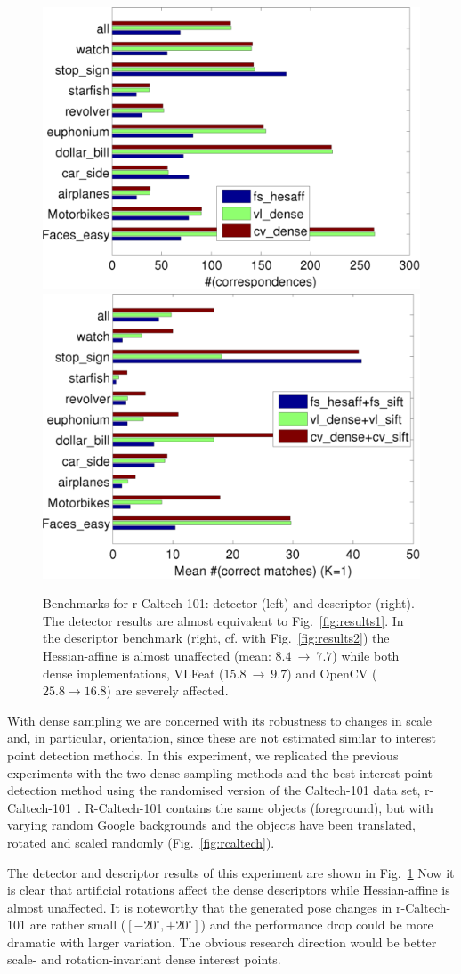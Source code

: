 \documentclass[journal]{IEEEtran}
\begin{document}
\begin{figure}
  \begin{center}
    \includegraphics[width=0.48\linewidth]{resources/joni_results/PLOT_detectors_benchmark1report2-rcaltech101-detcor-avg.png}
    \includegraphics[width=0.48\linewidth]{resources/joni_results/result-figure-report2-rcaltech101-mean-all-besmatches-1.png}
\caption{Benchmarks for r-Caltech-101: detector (left) and descriptor (right).
The detector results are almost equivalent to Fig.~\ref{fig:results1}.
In the descriptor benchmark (right, cf. with Fig.~\ref{fig:results2}) the Hessian-affine is almost
unaffected (mean: $8.4~\rightarrow~7.7$) while both dense implementations,
VLFeat ($15.8~\rightarrow~9.7$) and OpenCV ($25.8\rightarrow 16.8$) are severely
affected.}
\label{fig:rcaltechcomparison}
\end{center}
\end{figure}
%
With dense sampling we are concerned with its robustness to changes
in scale and, in particular, orientation, since these are not
estimated similar to interest point detection methods. In this experiment,
we replicated the previous experiments with the two dense sampling
methods and the best interest point detection method using the
randomised version of the Caltech-101 data set, r-Caltech-101~\cite{KinKamLen:2010}.
R-Caltech-101 contains the same objects (foreground), but with varying
random Google backgrounds and the objects have been translated, rotated
and scaled randomly (Fig.~\ref{fig:rcaltech}).

The detector and descriptor results of this experiment are shown in
Fig.~\ref{fig:rcaltechcomparison} %
Now it is clear that artificial
rotations affect the dense descriptors while Hessian-affine is
almost unaffected. It is noteworthy that the generated pose changes
in r-Caltech-101 are rather small ($[-20^\circ,+20^\circ]$) and
the performance drop could be more dramatic with larger variation.
The obvious research direction would be better scale- and rotation-invariant
dense interest points.
\end{document}
